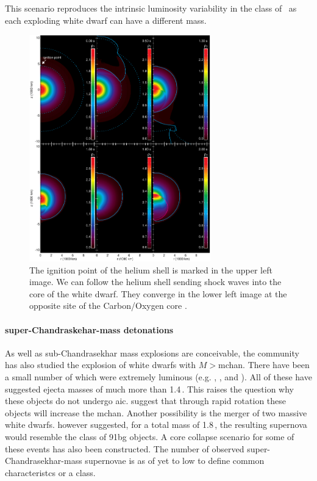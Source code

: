 This scenario reproduces the intrinsic luminosity variability in the class of \snia\ as each exploding white dwarf can have a different mass. 

\begin{figure}[htbp] %
   \centering
   \includegraphics[width=0.7\textwidth]{chapter_intro/plots/fink2010.pdf} 
   \caption{The ignition point of the helium shell is marked in the upper left image. We can follow the helium shell sending shock waves into the core of the white dwarf. They converge in the lower left image at the opposite site of the Carbon/Oxygen core \citep[data from][figure kindly provided by Michael Fink]{2010A&A...514A..53F}. }
   \label{fig:subch_fink2010}
\end{figure}

\paragraph{super-Chandraskehar-mass detonations}
As well as sub-Chandrasekhar mass explosions are conceivable, the community has also studied the explosion of white dwarfs with $M>$\gls{mchan}. There have been a small number of \sneia which were extremely luminous (e.g. , ,  and ). All of these have suggested ejecta masses of much more than 1.4\,\msun. This raises the question why these objects do not undergo \gls{aic}.  \cite{2005A&A...435..967Y} suggest that through rapid rotation these objects will increase the \gls{mchan}. Another possibility is the merger of two massive white dwarfs. \citet{2010Natur.463...61P} however suggested, for a total mass of 1.8\,\msun, the resulting supernova would resemble the class of \gls{91bg} objects. A core collapse scenario for some of these events has also been constructed. The number of observed super-Chandrasekhar-mass supernovae is as of yet to low to define common characteristcs or a class.


